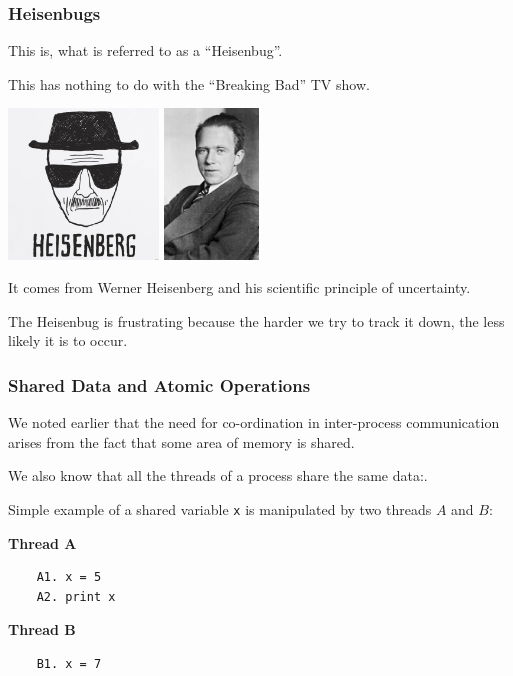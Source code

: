 \begin{frame}
\frametitle{Heisenbugs}

This is, what is referred to as a ``Heisenbug''.

This has nothing to do with the ``Breaking Bad'' TV show. 

\begin{center}
	\includegraphics[width=0.3\textwidth]{images/heisenberg.jpg}
	\includegraphics[width=0.1891\textwidth]{images/werner-heisenberg.jpg}
\end{center}

It comes from Werner Heisenberg and his scientific principle of uncertainty.

The Heisenbug is frustrating because the harder we try to track it down, the less likely it is to occur.


\end{frame}


\begin{frame}[fragile]
\frametitle{Shared Data and Atomic Operations}
We noted earlier that the need for co-ordination in inter-process communication arises from the fact that some area of memory is shared. 

We also know that all the threads of a process share the same data:. 

Simple example of a shared variable \texttt{x} is manipulated by two threads $A$ and $B$: 

\begin{multicols}{2}
\textbf{Thread A}
	\begin{verbatim}
	A1. x = 5
	A2. print x
	\end{verbatim}
\columnbreak
\textbf{Thread B}
	\begin{verbatim}
	B1. x = 7
	
	\end{verbatim}
\end{multicols}

\end{frame}

